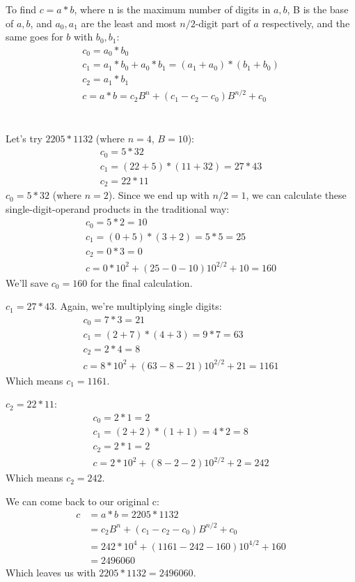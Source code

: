 \documentclass{article}
\begin{document}
\raggedright
To find $c = a*b$, where n is the maximum number of digits in $a, b$, B is the base of $a, b$, and $a_0, a_1$ are the least and most $n/2$-digit part of $a$ respectively, and the same goes for $b$ with $b_0, b_1$:
\begin{gather*}
    c_0 = a_0*b_0\\
    c_1 = a_1*b_0 + a_0*b_1 = (a_1 + a_0) * (b_1 + b_0)\\
    c_2 = a_1*b_1\\
    c = a*b = c_2 B^n + (c_1 - c_2 - c_0) B^{n/2} + c_0
\end{gather*}

\section{}
Let's try $2205 * 1132$ (where $n=4$, $B=10$):
\begin{gather*}
    c_0 = 5*32 \\
    c_1 = (22 + 5) * (11 + 32) = 27 * 43\\
    c_2 = 22*11
\end{gather*}
$c_0 = 5 * 32$ (where $n=2$). Since we end up with $n/2 = 1$, we can calculate these single-digit-operand products in the traditional way:
\begin{gather*}
    c_0 = 5*2 = 10\\
    c_1 = (0 + 5) * (3 + 2) = 5 * 5 = 25\\
    c_2 = 0*3 = 0\\
    c = 0*10^2 + (25 - 0 - 10) 10^{2/2} + 10 = 160
\end{gather*}
We'll save $c_0 = 160$ for the final calculation.

$c_1 = 27 * 43$. Again, we're multiplying single digits:
\begin{gather*}
    c_0 = 7*3 = 21\\
    c_1 = (2 + 7) * (4 + 3) = 9 * 7 = 63\\
    c_2 = 2*4 = 8\\
    c = 8 * 10^2 + (63 - 8 - 21) 10^{2/2} + 21 = 1161
\end{gather*}
Which means $c_1 = 1161$.

$c_2 = 22*11$:
\begin{gather*}
    c_0 = 2*1 = 2\\
    c_1 = (2 + 2) * (1 + 1) = 4 * 2 = 8\\
    c_2 = 2*1 = 2\\
    c = 2 * 10^2 + (8 - 2 - 2) 10^{2/2} + 2 = 242
\end{gather*}
Which means $c_2 = 242$.

We can come back to our original c:
\begin{align*}
    c &= a*b = 2205 * 1132\\
      &= c_2 B^n + (c_1 - c_2 - c_0) B^{n/2} + c_0\\
      &= 242 * 10^4 + (1161 - 242 - 160) 10^{4/2} + 160\\
      &= 2496060
\end{align*}
Which leaves us with $2205 * 1132 = 2496060$.
\end{document}
